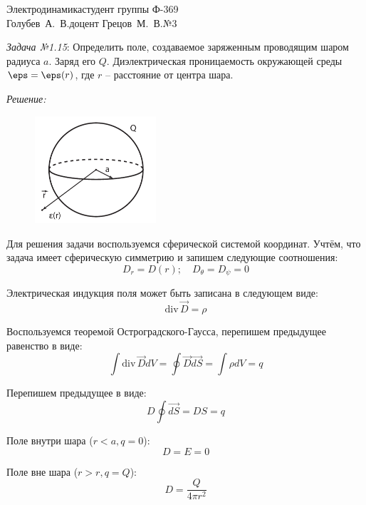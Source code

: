 




\usepackage{wrapfig}


{Электродинамика}{студент группы Ф-369\\Голубев~А.~В.}{доцент Грецов~М.~В.}{№3}

\newcommand{\grad}{\mathrm{grad}\,}
\renewcommand{\div}{\mathrm{div}\,}

\newpage

\emph{Задача №1.15}: Определить поле, создаваемое заряженным проводящим шаром 
радиуса \( a \). Заряд его \( Q \). Диэлектрическая проницаемость окружающей 
среды \( \eps = \eps(r) \), где \( r \) -- расстояние от центра шара.

\emph{Решение:} 

\begin{figure}
	\vspace{-2ex}
	\includegraphics[width=0.4\textwidth]{pdf/image_1_15}
\end{figure}

Для решения задачи воспользуемся сферической системой координат. Учтём, что 
задача имеет сферическую симметрию и запишем следующие соотношения:
\[
	D_r = D(r);\quad
	D_\theta = D_\psi = 0
\]

Электрическая индукция поля может быть записана в следующем виде:
\[
	\div{\vec{D}} = \rho
\]

Воспользуемся теоремой Остроградского-Гаусса, перепишем предыдущее равенство 
в виде:
\[
	\int \div\vec{D} dV = \oint \vec{D}\vec{dS} = \int \rho dV = q
\]

Перепишем предыдущее в виде:
\[
	D \oint\vec{dS} = DS = q
\]

Поле внутри шара (\( r < a, q = 0 \)):
\[
	D = E = 0
\]

Поле вне шара (\( r > r, q = Q \)):
\[
	D = \frac{Q}{4\pi r^2}
\]

